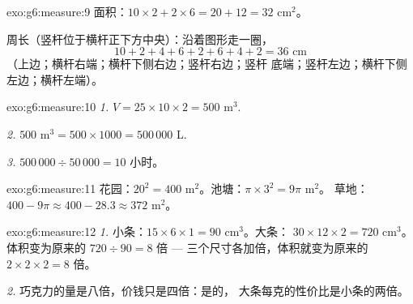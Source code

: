 \begin{solution}{exo:g6:measure:9}
面积：$10 \times 2 + 2 \times 6 = 20 + 12 = 32$ cm$^2$。

周长（竖杆位于横杆正下方中央）：沿着图形走一圈，
\[
10 + 2 + 4 + 6 + 2 + 6 + 4 + 2 = 36 \text{ cm}
\]
（上边；横杆右端；横杆下侧右边；竖杆右边；竖杆
底端；竖杆左边；横杆下侧左边；横杆左端）。
\end{solution}

\begin{solution}{exo:g6:measure:10}
\emph{1.} $V = 25 \times 10 \times 2 = 500$ m$^3$.

\emph{2.} $500$ m$^3 = 500 \times 1000 = 500\,000$ L.

\emph{3.} $500\,000 \div 50\,000 = 10$ 小时。
\end{solution}

\begin{solution}{exo:g6:measure:11}
花园：$20^2 = 400$ m$^2$。池塘：$\pi \times 3^2 = 9\pi$ m$^2$。
草地：$400 - 9\pi \approx 400 - 28.3 \approx 372$ m$^2$。
\end{solution}

\begin{solution}{exo:g6:measure:12}
\emph{1.} 小条：$15 \times 6 \times 1 = 90$ cm$^3$。大条：
$30 \times 12 \times 2 = 720$ cm$^3$。体积变为原来的
$720 \div 90 = 8$ 倍 --- 三个尺寸各加倍，体积就变为原来的
$2 \times 2 \times 2 = 8$ 倍。

\emph{2.} 巧克力的量是八倍，价钱只是四倍：是的，
大条每克的性价比是小条的两倍。
\end{solution}

